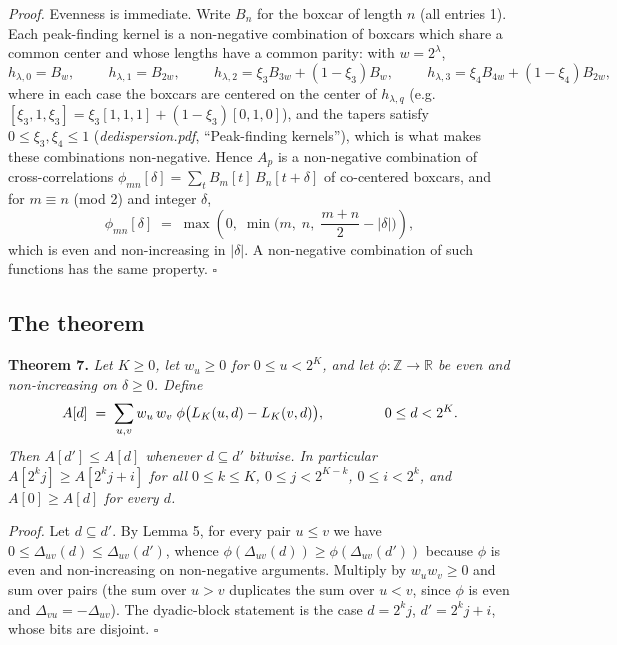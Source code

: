 \documentclass{article}
\numberwithin{equation}{section}   %
\newcommand{\ddnotes}[1]{{\em dedispersion.pdf}, ``#1''}
\begin{document}
\medskip
\par\noindent
{\em Proof.} Evenness is immediate. Write $B_n$ for the boxcar of length $n$ (all entries
1). Each peak-finding kernel is a non-negative combination of boxcars which share a common
center and whose lengths have a common parity: with $w = 2^\lambda$,
\begin{equation}
h_{\lambda,0} = B_w, \hspace{1cm}
h_{\lambda,1} = B_{2w}, \hspace{1cm}
h_{\lambda,2} = \xi_3 B_{3w} + (1-\xi_3) B_w, \hspace{1cm}
h_{\lambda,3} = \xi_4 B_{4w} + (1-\xi_4) B_{2w},
\end{equation}
where in each case the boxcars are centered on the center of $h_{\lambda,q}$
(e.g.\ $[\xi_3, 1, \xi_3] = \xi_3 [1,1,1] + (1-\xi_3) [0,1,0]$), and the tapers satisfy
$0 \le \xi_3, \xi_4 \le 1$ (\ddnotes{Peak-finding kernels}), which is what makes these
combinations non-negative. Hence $A_p$ is a
non-negative combination of cross-correlations
$\phi_{mn}[\delta] = \sum_t B_m[t] \, B_n[t+\delta]$ of co-centered boxcars, and for
$m \equiv n$ (mod 2) and integer $\delta$,
\begin{equation}
\phi_{mn}[\delta] \;=\; \max\left( 0, \; \min\Big( m, \; n, \; \frac{m+n}{2} - |\delta| \Big) \right),
\end{equation}
which is even and non-increasing in $|\delta|$. A non-negative combination of such functions
has the same property. $\square$

\subsection{The theorem}
\label{ssec:dyadic_theorem}

\par\noindent
{\bf Theorem 7.}
{\em Let $K \ge 0$, let $w_u \ge 0$ for $0 \le u < 2^K$, and let
$\phi : \mathbb{Z} \rightarrow \mathbb{R}$ be even and non-increasing on $\delta \ge 0$.
Define}
\begin{equation}
A[d] \;=\; \sum_{u,v} w_u \, w_v \; \phi\big( L_K(u,d) - L_K(v,d) \big),
  \hspace{1.5cm} 0 \le d < 2^K.
\label{eq:dyadic_abstract}
\end{equation}
{\em Then $A[d'] \le A[d]$ whenever $d \subseteq d'$ bitwise. In particular
$A[2^kj] \ge A[2^kj+i]$ for all $0 \le k \le K$, $0 \le j < 2^{K-k}$, $0 \le i < 2^k$, and
$A[0] \ge A[d]$ for every $d$.}

\medskip
\par\noindent
{\em Proof.} Let $d \subseteq d'$. By Lemma 5, for every pair $u \le v$ we have
$0 \le \Delta_{uv}(d) \le \Delta_{uv}(d')$, whence $\phi(\Delta_{uv}(d)) \ge
\phi(\Delta_{uv}(d'))$ because $\phi$ is even and non-increasing on non-negative arguments.
Multiply by $w_uw_v \ge 0$ and sum over pairs (the sum over $u>v$ duplicates the sum over
$u<v$, since $\phi$ is even and $\Delta_{vu} = -\Delta_{uv}$). The dyadic-block statement is
the case $d = 2^kj$, $d' = 2^kj+i$, whose bits are disjoint. $\square$
\end{document}
